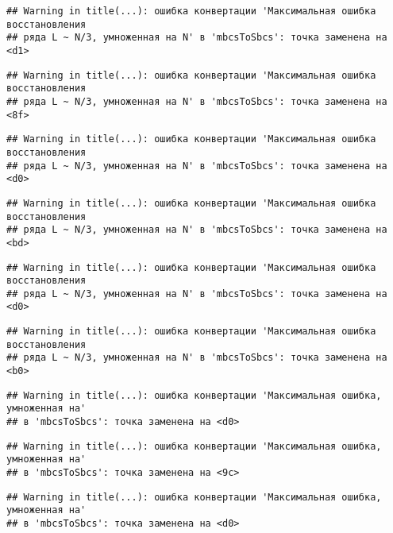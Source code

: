 \documentclass[
]{article}
\begin{document}
\begin{verbatim}
## Warning in title(...): ошибка конвертации 'Максимальная ошибка восстановления
## ряда L ~ N/3, умноженная на N' в 'mbcsToSbcs': точка заменена на <d1>
\end{verbatim}

\begin{verbatim}
## Warning in title(...): ошибка конвертации 'Максимальная ошибка восстановления
## ряда L ~ N/3, умноженная на N' в 'mbcsToSbcs': точка заменена на <8f>
\end{verbatim}

\begin{verbatim}
## Warning in title(...): ошибка конвертации 'Максимальная ошибка восстановления
## ряда L ~ N/3, умноженная на N' в 'mbcsToSbcs': точка заменена на <d0>
\end{verbatim}

\begin{verbatim}
## Warning in title(...): ошибка конвертации 'Максимальная ошибка восстановления
## ряда L ~ N/3, умноженная на N' в 'mbcsToSbcs': точка заменена на <bd>
\end{verbatim}

\begin{verbatim}
## Warning in title(...): ошибка конвертации 'Максимальная ошибка восстановления
## ряда L ~ N/3, умноженная на N' в 'mbcsToSbcs': точка заменена на <d0>
\end{verbatim}

\begin{verbatim}
## Warning in title(...): ошибка конвертации 'Максимальная ошибка восстановления
## ряда L ~ N/3, умноженная на N' в 'mbcsToSbcs': точка заменена на <b0>
\end{verbatim}

\begin{verbatim}
## Warning in title(...): ошибка конвертации 'Максимальная ошибка, умноженная на'
## в 'mbcsToSbcs': точка заменена на <d0>
\end{verbatim}

\begin{verbatim}
## Warning in title(...): ошибка конвертации 'Максимальная ошибка, умноженная на'
## в 'mbcsToSbcs': точка заменена на <9c>
\end{verbatim}

\begin{verbatim}
## Warning in title(...): ошибка конвертации 'Максимальная ошибка, умноженная на'
## в 'mbcsToSbcs': точка заменена на <d0>
\end{verbatim}
\end{document}
